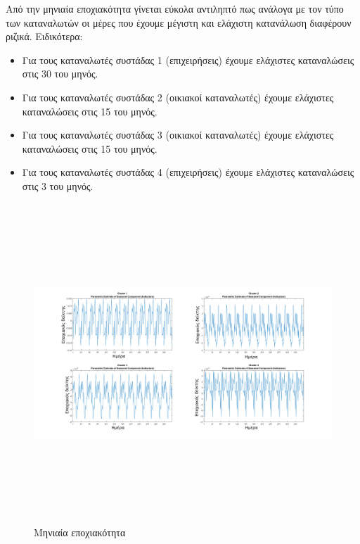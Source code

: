 Από την μηνιαία εποχιακότητα γίνεται εύκολα αντιληπτό πως ανάλογα με τον τύπο των καταναλωτών οι μέρες που έχουμε μέγιστη και ελάχιστη κατανάλωση διαφέρουν ριζικά. Ειδικότερα:
\begin{itemize}
\item Για τους καταναλωτές συστάδας 1 (επιχειρήσεις) έχουμε ελάχιστες καταναλώσεις στις 30 του μηνός.
\item Για τους καταναλωτές συστάδας 2 (οικιακοί καταναλωτές) έχουμε ελάχιστες καταναλώσεις στις 15 του μηνός.
\item Για τους καταναλωτές συστάδας 3 (οικιακοί καταναλωτές) έχουμε ελάχιστες καταναλώσεις στις 15 του μηνός.
\item Για τους καταναλωτές συστάδας 4 (επιχειρήσεις) έχουμε ελάχιστες καταναλώσεις στις 3 του μηνός.
\end{itemize}
\begin{figure}[ht!]
\centering
\includegraphics[width=180mm, height=120mm]{../../plots/Trend_estimation/seasonal_month_ALL.png}
\caption{Μηνιαία εποχιακότητα}
\label{fig:season daypermonth}
\end{figure}

